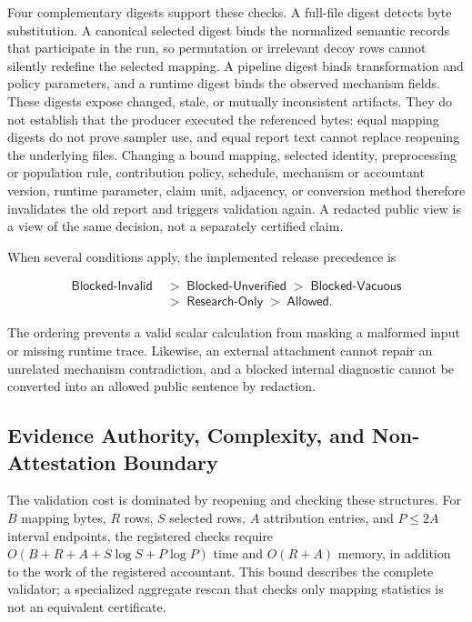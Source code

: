 Four complementary digests support these checks.  A full-file digest detects byte
substitution.  A canonical selected digest binds the normalized semantic records
that participate in the run, so permutation or irrelevant decoy rows cannot
silently redefine the selected mapping.  A pipeline digest binds transformation
and policy parameters, and a runtime digest binds the observed mechanism fields.
These digests expose changed, stale, or mutually inconsistent artifacts.  They do
not establish that the producer executed the referenced bytes: equal mapping
digests do not prove sampler use, and equal report text cannot replace reopening
the underlying files.  Changing a bound mapping, selected identity, preprocessing
or population rule, contribution policy, schedule, mechanism or accountant
version, runtime parameter, claim unit, adjacency, or conversion method therefore
invalidates the old report and triggers validation again.  A redacted public view
is a view of the same decision, not a separately certified claim.

When several conditions apply, the implemented release precedence is

\begin{equation}
\begin{split}
    \textsf{Blocked-Invalid} &\;>\; \textsf{Blocked-Unverified}
    \;>\; \textsf{Blocked-Vacuous} \\
    &\;>\; \textsf{Research-Only} \;>\; \textsf{Allowed}.
\end{split}
\label{eq:ch2-release-precedence}
\end{equation}

The ordering prevents a valid scalar calculation from masking a malformed input
or missing runtime trace.  Likewise, an external attachment cannot repair an
unrelated mechanism contradiction, and a blocked internal diagnostic cannot be
converted into an allowed public sentence by redaction.

\subsection{Evidence Authority, Complexity, and Non-Attestation Boundary}
\label{subsec:ch2-evidence-authority}

The validation cost is dominated by reopening and checking these structures.  For
\(B\) mapping bytes, \(R\) rows, \(S\) selected rows, \(A\) attribution entries,
and \(P\leq2A\) interval endpoints, the registered checks require
\(O(B+R+A+S\log S+P\log P)\) time and \(O(R+A)\) memory, in addition to the work
of the registered accountant.  This bound describes the complete validator; a
specialized aggregate rescan that checks only mapping statistics is not an
equivalent certificate.

